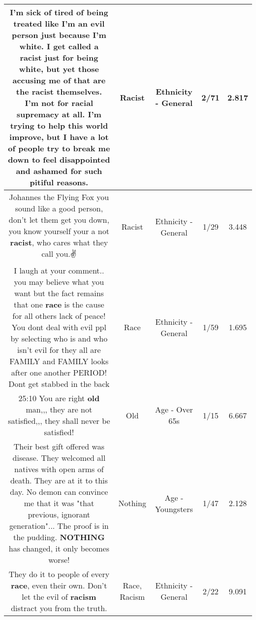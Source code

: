 \documentclass[11pt]{article}
\newlength\mylength
\begin{document}
\begin{center}
\begin{longtable}{|C{.65\mylength}|C{.30\mylength}|C{.12\mylength}|C{.12\mylength}|C{.12\mylength}|}
  \small I'm sick of tired of being treated like I'm an evil person just because I'm white. I get called a \textbf{racist} just for being white, but yet those accusing me of that are the \textbf{racist} themselves. I'm not for racial supremacy at all. I'm trying to help this world improve, but I have a lot of people try to break me down to feel disappointed and ashamed for such pitiful reasons.\normalsize   & Racist & Ethnicity - General & 2/71 & 2.817 \\  \hline
  \small Johannes the Flying Fox you sound like a good person, don't let them get you down, you know yourself your a not \textbf{racist}, who cares what they call you.✌️\normalsize   & Racist & Ethnicity - General & 1/29 & 3.448 \\  \hline
  \small I laugh at your comment.. you may believe what you want but the fact remains that one \textbf{race} is the cause for all others lack of peace! You dont deal with evil ppl by selecting who is and who isn't evil for they all are FAMILY and FAMILY looks after one another PERIOD! Dont get stabbed in the back\normalsize   & Race & Ethnicity - General & 1/59 & 1.695 \\  \hline
  \small 25:10 You are right \textbf{old} man,,, they are not satisfied,,, they shall never be satisfied!\normalsize   & Old & Age - Over 65s & 1/15 & 6.667 \\  \hline
  \small Their best gift offered was disease. They welcomed all natives with open arms of death. They are at it to this day. No demon can convince me that it was "that previous, ignorant generation"... The proof is in the pudding. \textbf{NOTHING} has changed, it only becomes worse!\normalsize   & Nothing & Age - Youngsters & 1/47 & 2.128 \\  \hline
  \small They do it to people of every \textbf{race}, even their own. Don't let the evil of \textbf{racism} distract you from the truth.\normalsize   & Race, Racism & Ethnicity - General & 2/22 & 9.091 \\  \hline

\end{longtable}
\end{center}
\end{document}
